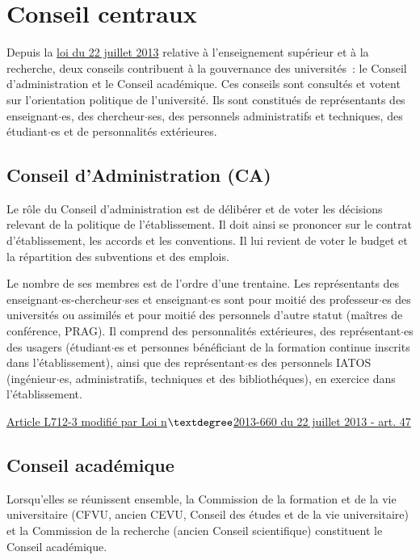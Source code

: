 \section{Conseil centraux}
Depuis la \href{https://www.legifrance.gouv.fr/affichTexte.do;jsessionid=C8BFF801F2976E9272297AB33338C553.tpdila14v_3?cidTexte=JORFTEXT000027735009&dateTexte=20170113}{loi du 22 juillet 2013} relative {\`a} l'enseignement sup{\'e}rieur et {\`a} la recherche, 
deux conseils contribuent \`a la gouvernance des universit\'es~: le Conseil d'administration et le Conseil acad{\'e}mique. Ces conseils sont consult\'es et votent sur 
l'orientation politique de l'universit{\'e}. Ils sont constitu\'es de repr{\'e}sentants des enseignant$\cdot$es, des chercheur$\cdot$ses, des personnels administratifs et techniques, 
des {\'e}tudiant$\cdot$es et de personnalit{\'e}s ext{\'e}rieures. 


\subsection{Conseil d'Administration (CA)}
Le r\^ole du Conseil d'administration est de d\'elib\'erer et de voter les d\'ecisions relevant de la politique de l'\'etablissement. Il doit ainsi se prononcer sur
le contrat d'\'etablissement, les accords et les conventions. Il lui revient de voter le budget et la r\'epartition des subventions et des emplois. 

Le nombre de ses membres est de l'ordre d'une trentaine. Les repr\'esentants des enseignant$\cdot$es-chercheur$\cdot$ses et enseignant$\cdot$es  sont pour moiti\'e des professeur$\cdot$es des universit\'es ou assimil\'es et pour moiti\'e des personnels d'autre statut (ma\^itres de conf\'erence, PRAG). Il comprend des personnalit\'es ext\'erieures, des repr\'esentant$\cdot$es des usagers (\'etudiant$\cdot$es et personnes b\'en\'eficiant de la formation continue inscrits dans l'\'etablissement),
ainsi que des repr\'esentant$\cdot$es des personnels IATOS (ing\'enieur$\cdot$es, administratifs, techniques et des biblioth\'eques), en exercice dans l'\'etablissement. 

\href{https://www.legifrance.gouv.fr/affichCodeArticle.do;jsessionid=C8BFF801F2976E9272297AB33338C553.tpdila14v_3?idArticle=LEGIARTI000027747951&cidTexte=LEGITEXT000006071191&dateTexte=20170113}{Article L712-3 modifi\'e par Loi n$\textdegree$2013-660 du 22 juillet 2013 - art. 47}

\subsection{Conseil acad{\'e}mique}
Lorsqu'elles se r\'eunissent ensemble, la Commission de la formation et de la vie universitaire 
(CFVU, ancien CEVU, Conseil des {\'e}tudes et de la vie universitaire) et la Commission de la recherche (ancien Conseil scientifique) constituent le Conseil acad\'emique.


